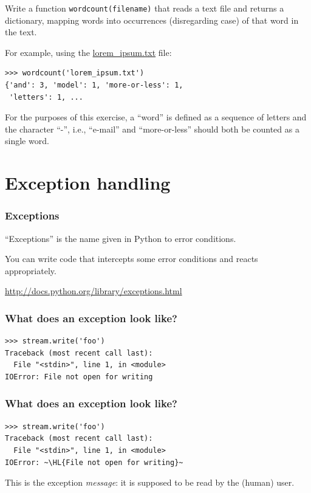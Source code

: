 \documentclass[english,serif,mathserif,xcolor=pdftex,dvipsnames,table]{beamer}
\begin{document}
\begin{frame}[fragile]
\begin{exercise*}[11]
    Write a function \lstinline|wordcount(filename)| that reads a text
    file and returns a dictionary, mapping words into occurrences
    (disregarding case) of that word in the text.

    \+ For example, using the
    \href{https://raw.github.com/gc3-uzh-ch/python-course/master/lorem_ipsum.txt}{lorem\_ipsum.txt}
    file:
    \begin{lstlisting}
>>> wordcount('lorem_ipsum.txt')
{'and': 3, 'model': 1, 'more-or-less': 1,
 'letters': 1, ...
    \end{lstlisting}

    \+ For the purposes of this
    exercise, a ``word'' is defined as a sequence of letters and the
    character ``-'', i.e., ``e-mail'' and ``more-or-less'' should both
    be counted as a single word.
  \end{exercise*}
\end{frame}


\section{Exception handling}

\begin{frame}[fragile]
  \frametitle{Exceptions}

  ``Exceptions'' is the name given in Python to error conditions.

  \+
  You can write code that intercepts some error conditions and
  reacts appropriately.

  \+
  \begin{seealso}
    \url{http://docs.python.org/library/exceptions.html}
  \end{seealso}
\end{frame}


\begin{frame}[fragile]
  \frametitle{What does an exception look like?}
\begin{lstlisting}
>>> stream.write('foo')
Traceback (most recent call last):
  File "<stdin>", line 1, in <module>
IOError: File not open for writing
\end{lstlisting}
\end{frame}


\begin{frame}[fragile]
  \frametitle{What does an exception look like?}
\begin{lstlisting}
>>> stream.write('foo')
Traceback (most recent call last):
  File "<stdin>", line 1, in <module>
IOError: ~\HL{File not open for writing}~
\end{lstlisting}

  \+
  This is the exception \emph{message}: it is supposed to be read
  by the (human) user.
\end{frame}
\end{document}
